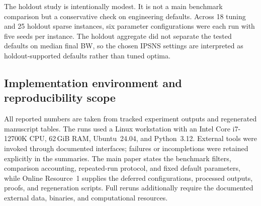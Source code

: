 The holdout study is intentionally modest. It is not a main benchmark comparison but a conservative check on engineering defaults. Across 18 tuning and 25 holdout sparse instances, six parameter configurations were each run with five seeds per instance. The holdout aggregate did not separate the tested defaults on median final BW, so the chosen IPSNS settings are interpreted as holdout-supported defaults rather than tuned optima.

\subsection{Implementation environment and reproducibility scope}

All reported numbers are taken from tracked experiment outputs and regenerated manuscript tables. The runs used a Linux workstation with an Intel Core i7-12700K CPU, 62\,GiB RAM, Ubuntu~24.04, and Python~3.12. External tools were invoked through documented interfaces; failures or incompletions were retained explicitly in the summaries. The main paper states the benchmark filters, comparison accounting, repeated-run protocol, and fixed default parameters, while Online Resource~1 supplies the deferred configurations, processed outputs, proofs, and regeneration scripts. Full reruns additionally require the documented external data, binaries, and computational resources.


